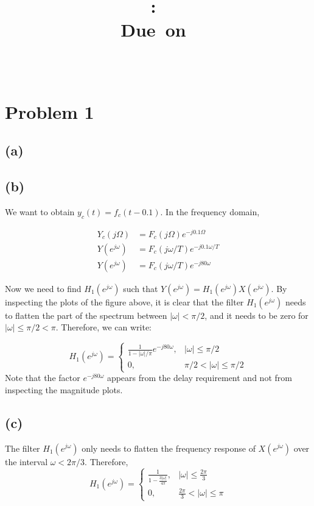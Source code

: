 \documentclass{article}
\title{
\vspace{2in}
\textmd{\textbf{\hmwkClass:\ \hmwkTitle}}\\
\normalsize\vspace{0.1in}\small{Due\ on\ \hmwkDueDate}\\
\vspace{0.1in}\large{\textit{\hmwkClassInstructor\ \hmwkClassTime}}
\vspace{3in}
}
\author{\textbf{\hmwkAuthorName}}
\date{} %
\begin{document}
\section{Problem 1}
\subsection{(a)}
\resizebox{\linewidth}{!}{}

\subsection{(b)}
We want to obtain $y_c(t) = f_c(t-0.1)$. In the frequency domain,

\begin{align}
Y_c(j\Omega) &= F_c(j\Omega)e^{-j0.1\Omega} \tag{Delay property of the Fourier transform} \\
Y(e^{j\omega}) &= F_c(j\omega/T)e^{-j0.1\omega/T} \tag{Since $\Omega = \omega/T$ and there is no aliasing} \\
Y(e^{j\omega}) &= F_c(j\omega/T)e^{-j80\omega} \tag{$T = 1/800$}
\end{align}

\resizebox{\linewidth}{!}{}

Now we need to find $H_1(e^{j\omega})$ such that $Y(e^{j\omega}) = H_1(e^{j\omega})X(e^{j\omega})$. By inspecting the plots of the figure above, it is clear that the filter $H_1(e^{j\omega})$ needs to flatten the part of the spectrum between $|\omega| <\pi/2$, and it needs to be zero for $|\omega| \leq \pi/2 < \pi$. Therefore, we can write:

\begin{equation}
H_1(e^{j\omega}) = \begin{cases}
\displaystyle\frac{1}{1 - |\omega|/\pi}e^{-j80\omega}, & |\omega|\leq\pi/2 \\
0, & \pi/2 < |\omega|\leq\pi/2
\end{cases}
\end{equation}
Note that the factor $e^{-j80\omega}$ appears from the delay requirement and not from inspecting the magnitude plots.

\subsection{(c)}
\resizebox{\linewidth}{!}{}

The filter $H_1(e^{j\omega})$ only needs to flatten the frequency response of $X(e^{j\omega})$ over the interval $\omega < 2\pi/3$. Therefore,
\begin{equation}
H_1(e^{j\omega}) = \begin{cases}
\frac{1}{1 - \displaystyle\frac{3|\omega|}{4\pi}}, & |\omega|\leq \frac{2\pi}{3} \\
0, & \frac{2\pi}{3} < |\omega|\leq \pi
\end{cases}
\end{equation}
		
\end{document}
